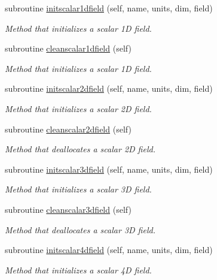 \begin{DoxyCompactItemize}
subroutine \mbox{\hyperlink{namespacefieldtypes__mod_a96ff5318da6a7db8bb61c525315c1c89}{initscalar1dfield}} (self, name, units, dim, field)
\begin{DoxyCompactList}\small\item\em Method that initializes a scalar 1D field. \end{DoxyCompactList}\item 
subroutine \mbox{\hyperlink{namespacefieldtypes__mod_aeb05bd1de9be296711016ad5b607a091}{cleanscalar1dfield}} (self)
\begin{DoxyCompactList}\small\item\em Method that initializes a scalar 1D field. \end{DoxyCompactList}\item 
subroutine \mbox{\hyperlink{namespacefieldtypes__mod_a1a3160727c99017639d758aad9031df5}{initscalar2dfield}} (self, name, units, dim, field)
\begin{DoxyCompactList}\small\item\em Method that initializes a scalar 2D field. \end{DoxyCompactList}\item 
subroutine \mbox{\hyperlink{namespacefieldtypes__mod_a26a4170db6067cf4ba85099f9701ff4c}{cleanscalar2dfield}} (self)
\begin{DoxyCompactList}\small\item\em Method that deallocates a scalar 2D field. \end{DoxyCompactList}\item 
subroutine \mbox{\hyperlink{namespacefieldtypes__mod_a3f2b90bc391ea5b84ead8069ee90f515}{initscalar3dfield}} (self, name, units, dim, field)
\begin{DoxyCompactList}\small\item\em Method that initializes a scalar 3D field. \end{DoxyCompactList}\item 
subroutine \mbox{\hyperlink{namespacefieldtypes__mod_a9f3716bcbd2524ed608c86920cab8693}{cleanscalar3dfield}} (self)
\begin{DoxyCompactList}\small\item\em Method that deallocates a scalar 3D field. \end{DoxyCompactList}\item 
subroutine \mbox{\hyperlink{namespacefieldtypes__mod_a21dba84bb8fdb02d8bf5fd0052b51283}{initscalar4dfield}} (self, name, units, dim, field)
\begin{DoxyCompactList}\small\item\em Method that initializes a scalar 4D field. \end{DoxyCompactList}\item 

\end{DoxyCompactItemize}
